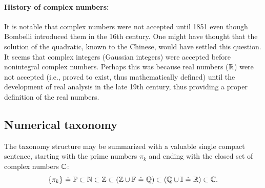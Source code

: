 \documentclass{ximera}
\begin{document}
\EEx

\paragraph{History of complex numbers:}
It is notable that complex numbers were not accepted until 1851 even though Bombelli introduced them in the 16th century.
One might have thought that the solution of the quadratic, known to the Chinese, would have
settled this question.  It seems that complex integers (Gaussian integers) were accepted
before nonintegral complex numbers.  Perhaps this was because real numbers ($\mathbb{R}$) were not accepted
(i.e., proved to exist, thus mathematically defined) until the development of real analysis in
the late 19th century, thus providing a proper definition of the real numbers.
  
\subsection{Numerical taxonomy}


The taxonomy structure may be summarized with a valuable single compact sentence, starting with the prime
numbers $\pi_k$ and ending with the closed set of complex numbers $\mathbb{C}$:
\[
	\{\pi_k\}\ \dot{=}\ \P \subset \N \subset \Z \subset (\Z\cup \F\ \dot=\ \Q) \subset (\Q\cup
	\I\ \dot=\ \R) \subset \C.
\]

\end{document}

